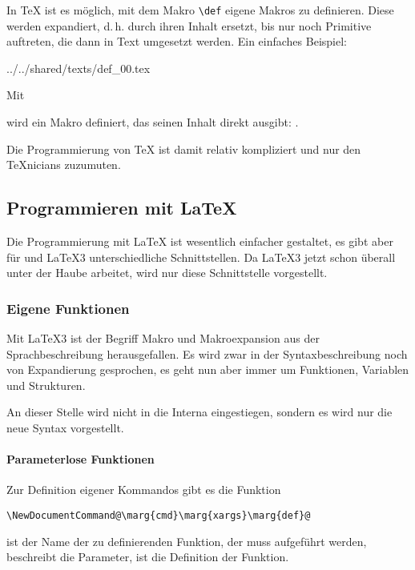 \documentclass[ngerman,               %
               a4paper,               %
               fleqn,                 %
                     ]{scrartcl}       %
\begin{document}
In \TeX{} ist es möglich, mit dem Makro \lstinline|\def| eigene Makros
zu definieren. Diese werden expandiert, d.\,h. durch ihren Inhalt
ersetzt, bis nur noch Primitive auftreten, die dann in Text umgesetzt
werden. Ein einfaches Beispiel:
\begin{verbatimwrite}{../../shared/texts/def_00.tex}
  \def\dreiA{AAA}
\end{verbatimwrite}
Mit

wird ein Makro definiert, das seinen Inhalt direkt ausgibt:
\dreiA.

\dreiA\hspace{\fill}\dreiA\hspace{\fill}\dreiA

Die Programmierung von \TeX{} ist damit relativ kompliziert und nur
den \TeX nicians zuzumuten.

\subsection{Programmieren mit \LaTeX}

Die Programmierung mit \LaTeX{} ist wesentlich einfacher gestaltet, es gibt
aber für \LaTeXe{} und \LaTeX3 unterschiedliche Schnittstellen. Da \LaTeX3 jetzt
schon überall unter der Haube arbeitet, wird nur diese Schnittstelle
vorgestellt.

\subsubsection{Eigene Funktionen}

Mit \LaTeX3 ist der Begriff Makro und Makroexpansion aus der Sprachbeschreibung
herausgefallen. Es wird zwar in der Syntaxbeschreibung noch von Expandierung
gesprochen, es geht nun aber immer um Funktionen, Variablen und Strukturen.

An dieser Stelle wird nicht in die Interna eingestiegen, sondern es wird
nur die neue Syntax vorgestellt.


\paragraph{Parameterlose Funktionen}

Zur Definition eigener Kommandos gibt es die Funktion
\begin{lstlisting}[escapechar=@]
\NewDocumentCommand@\marg{cmd}\marg{xargs}\marg{def}@
\end{lstlisting}
 ist der Name der zu definierenden Funktion, der \cs{} muss
aufgeführt werden, 
beschreibt die Parameter,  ist die Definition der Funktion.
\end{document}

